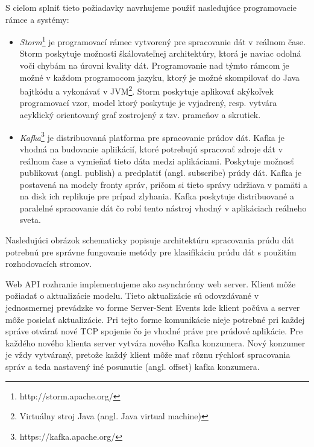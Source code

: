 S cieľom splniť tieto požiadavky navrhujeme použiť nasledujúce programovacie rámce a systémy:
\begin{itemize}
	\item \textit{Storm}\footnote{http://storm.apache.org/} je programovací rámec vytvorený pre spracovanie dát v reálnom čase. Storm poskytuje možnosti škálovateľnej architektúry, ktorá je naviac odolná voči chybám na úrovni kvality dát. Programovanie nad týmto rámcom je možné v každom programocom jazyku, ktorý je možné skompilovať do Java bajtkódu a vykonávať v JVM\footnote{Virtuálny stroj Java (angl. Java virtual machine)}. Storm poskytuje aplikovať akýkoľvek programovací vzor, model ktorý poskytuje je vyjadrený, resp. vytvára acyklický orientovaný graf zostrojený z tzv. prameňov a skrutiek.
	\item \textit{Kafka}\footnote{https://kafka.apache.org/} je distribuovaná platforma pre spracovanie prúdov dát. Kafka je vhodná na budovanie apliikácií, ktoré potrebujú spracovať zdroje dát v reálnom čase a vymieňať tieto dáta medzi aplikáciami. Poskytuje možnosť publikovat (angl. publish) a predplatiť (angl. subscribe) prúdy dát. Kafka je postavená na modely fronty správ, pričom si tieto správy udržiava v pamäti a na disk ich replikuje pre prípad zlyhania. Kafka poskytuje distribuované a paralelné spracovanie dát čo robí tento nástroj vhodný v aplikáciach reálneho sveta.
\end{itemize}

Nasledujúci obrázok schematicky popisuje architektúru spracovania prúdu dát potrebnú pre správne fungovanie metódy pre klasifikáciu prúdu dát s použitím rozhodovacích stromov.
\label{fig:architecture}

Web API rozhranie implementujeme ako asynchrónny web server. Klient môže požiadať o aktualizácie modelu. Tieto aktualizácie sú odovzdávané v jednosmernej prevádzke vo forme Server-Sent Events kde klient počúva a server môže posielať aktualizácie. Pri tejto forme komunikácie nieje potrebné pri každej správe otvárať nové TCP spojenie čo je vhodné práve pre prúdové aplikácie. Pre každého nového klienta server vytvára nového Kafka konzumera. Nový konzumer je vždy vytváraný, pretože každý klient môže mať rôznu rýchlosť spracovania správ a teda nastavený iné posunutie (angl. offset) kafka konzumera.

